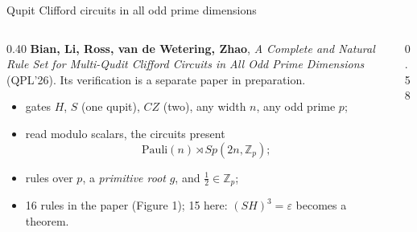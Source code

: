 \begin{frame}{Qupit Clifford circuits in all odd prime dimensions \New}
\begin{columns}[c]
\begin{column}{0.40\textwidth}
\small
\textbf{Bian, Li, Ross, van de Wetering, Zhao}, \emph{A Complete and Natural
Rule Set for Multi-Qudit Clifford Circuits in All Odd Prime Dimensions}
(QPL'26). Its verification is a separate paper in preparation.
\begin{itemize}
  \item gates $H$, $S$ (one qupit), $CZ$ (two), any width $n$, any odd prime $p$;
  \item read \alert{modulo scalars}, the circuits present
        \[\text{Pauli}(n)\rtimes Sp(2n,\mathbb{Z}_p);\]
  \item rules over $p$, a \emph{primitive root} $g$, and $\frac12\in\mathbb{Z}_p$;
  \item 16 rules in the paper (Figure 1); 15 here: $(SH)^3=\varepsilon$
        becomes a theorem.
\end{itemize}
\end{column}
\begin{column}{0.58\textwidth}
\renewcommand{\AgdaCodeStyle}{\scriptsize}
\begin{code}%
\>[0]\AgdaSpace{}%
\AgdaSpace{}%
\AgdaSymbol{:}\AgdaSpace{}%
\AgdaSymbol{(}\AgdaSpace{}%
\AgdaSymbol{:}\AgdaSpace{}%
\AgdaSymbol{)}\AgdaSpace{}%
\AgdaSpace{}%
\AgdaSpace{}%
\AgdaSymbol{(}\AgdaSpace{}%
\AgdaSymbol{)}\AgdaSpace{}%
\<%
\\
\>[0][@{}l@{\AgdaIndent{0}}]%
\>[2]\AgdaSpace{}%
\AgdaSymbol{:}%
\>[18]\AgdaSymbol{(}\AgdaSpace{}%
\AgdaSymbol{)}\AgdaSpace{}%
%
\>[32]\AgdaSpace{}%
\AgdaOperator{\AgdaPostulate{\textasciicircum{}}}\AgdaSpace{}%
\AgdaSpace{}%
\AgdaOperator{\AgdaDatatype{===}}\AgdaSpace{}%
\<%
\\
%
\>[2]\AgdaSpace{}%
\AgdaSymbol{:}%
\>[18]\AgdaSymbol{(}\AgdaSpace{}%
\AgdaSymbol{)}\AgdaSpace{}%
%
\>[32]\AgdaSpace{}%
\AgdaOperator{\AgdaPostulate{\textasciicircum{}}}\AgdaSpace{}%

\end{code}
\end{column}
\end{columns}
\end{frame}
